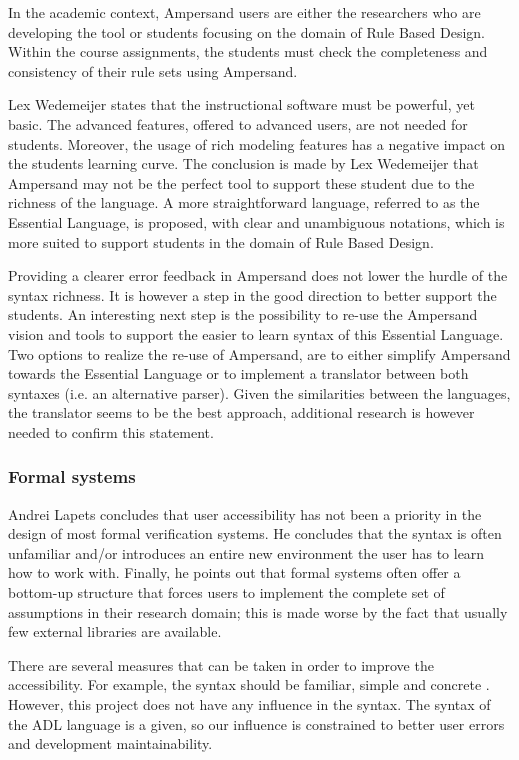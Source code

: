 In the academic context, Ampersand users are either the researchers who are developing the tool or students focusing on the domain of Rule Based Design. 
Within the course assignments, the students must check the completeness and consistency of their rule sets using Ampersand. 

Lex Wedemeijer  states that the instructional software must be powerful, yet basic.
The advanced features, offered to advanced users, are not needed for students.
Moreover, the usage of rich modeling features has a negative impact on the students learning curve.
The conclusion is made by Lex Wedemeijer that Ampersand may not be the perfect tool to support these student due to the richness of the language.
A more straightforward language, referred to as the Essential Language, is proposed, with clear and unambiguous notations, which is more suited to support students in the domain of Rule Based Design.

Providing a clearer error feedback in Ampersand does not lower the hurdle of the syntax richness.
It is however a step in the good direction to better support the students. 
An interesting next step is the possibility to re-use the Ampersand vision and tools to support the easier to learn syntax of this Essential Language.
Two options to realize the re-use of Ampersand, are to either simplify Ampersand towards the Essential Language or to implement a translator between both syntaxes (i.e. an alternative parser).
Given the similarities between the languages, the translator seems to be the best approach, additional research is however needed to confirm this statement.

\subsubsection{Formal systems}
Andrei Lapets  concludes that user accessibility has not been a priority in the design of most formal verification systems.
He concludes that the syntax is often unfamiliar and/or introduces an entire new environment the user has to learn how to work with.
Finally, he points out that formal systems often offer a bottom-up structure that forces users to implement the complete set of assumptions in their research domain; this is made worse by the fact that usually few external libraries are available.

There are several measures that can be taken in order to improve the accessibility.
For example, the syntax should be familiar, simple and concrete .
However, this project does not have any influence in the syntax.
The syntax of the ADL language is a given, so our influence is constrained to better user errors and development maintainability.


